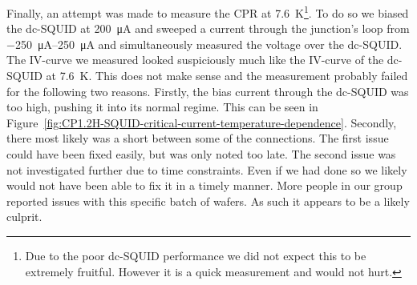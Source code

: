 Finally, an attempt was made to measure the CPR at \qty{7.6}{\kelvin}\footnote{Due to the poor dc-SQUID performance we did not expect this to be extremely fruitful. However it is a quick measurement and would not hurt.}. To do so we biased the dc-SQUID at \qty{200}{\micro\ampere} and sweeped a current through the junction's loop from \qtyrange{-250}{250}{\micro\ampere} and simultaneously measured the voltage over the dc-SQUID. The IV-curve we measured looked suspiciously much like the IV-curve of the dc-SQUID at \qty{7.6}{\kelvin}. This does not make sense and the measurement probably failed for the following two reasons. Firstly, the bias current through the dc-SQUID was too high, pushing it into its normal regime. This can be seen in Figure~\ref{fig:CP1.2H-SQUID-critical-current-temperature-dependence}. Secondly, there most likely was a short between some of the connections. The first issue could have been fixed easily, but was only noted too late. The second issue was not investigated further due to time constraints. Even if we had done so we likely would not have been able to fix it in a timely manner. More people in our group reported issues with this specific batch of  wafers. As such it appears to be a likely culprit.